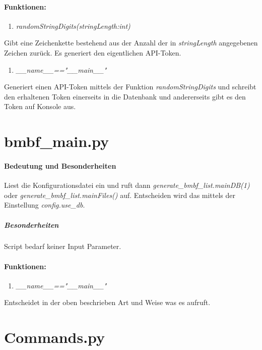 \documentclass[12pt,parskip=full, pagea4]{scrreprt}
\begin{document}
			\paragraph{Funktionen:}
			\begin{enumerate}
				\item \textit{randomStringDigits(stringLength:int)} 
			\end{enumerate}
			\leftskip=1.5cm Gibt eine Zeichenkette bestehend aus der Anzahl der in \textit{stringLength} angegebenen Zeichen zurück. Es generiert den eigentlichen API-Token.
			\begin{enumerate}[resume]
				\item \textit{\_\_name\_\_=="\_\_main\_\_"}	
			\end{enumerate}
			\leftskip=1.5cm	Generiert einen API-Token mittels der Funktion \textit{randomStringDigits} und schreibt den erhaltenen Token einerseits in die Datenbank und andererseits gibt es den Token auf Konsole aus.
			
			\leftskip=0cm		

			\section{bmbf\_main.py}
			\paragraph{Bedeutung und Besonderheiten}Liest die Konfigurationsdatei ein und ruft dann \textit{generate\_bmbf\_list.mainDB(1)} oder \textit{generate\_bmbf\_list.mainFiles()} auf. Entscheiden wird das mittels der Einstellung \textit{config.use\_db}.
			\subparagraph{Besonderheiten}Script bedarf keiner Input Parameter.
			\paragraph{Funktionen:}
			\begin{enumerate}
				\item \textit{\_\_name\_\_=="\_\_main\_\_"}	
			\end{enumerate}
			\leftskip=1.5cm	Entscheidet in der oben beschrieben Art und Weise was es aufruft.
			
			\leftskip=0cm	
			
			\section{Commands.py}
\end{document}
